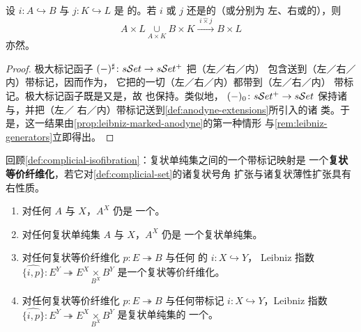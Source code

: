 \begin{corollary}\label{cor:leibniz-anodyne}
设 $i\colon A\hookrightarrow B$ 与 $j\colon K\hookrightarrow L$ 是%
\trSimplicialSet{}的\trMonomorphism。若 $i$ 或 $j$ 还是\trAnodyne{}的（或分别为
左\trAnodyne、右\trAnodyne{}或\trInnerAnodyne{}的），则\trLeibnizProduct
\[ A\times L\underset{A\times K}{\cup}B\times K
   \xrightarrow{\;i\mathbin{\widehat{\times}}j\;}B\times L \]
亦然。
\end{corollary}

\begin{proof}
极大标记函子 $(-)^{\sharp}\colon s\mathcal{S}et\to s\mathcal{S}et^{+}$ 把（左／右／内）
\trHorn{}包含送到（左／右／内）带标记\trAnodyneExtension，因而作为\trLeftAdjoint，
它把\trSimplicialSet{}的一切（左／右／内）\trAnodyneExtension{}都带到（左／右／内）
带标记\trAnodyneExtension。极大标记函子既是\trLeftAdjoint{}又是\trRightAdjoint，故
也保持\trLeibnizProduct。类似地，\trForgetfulFunctor{}
$(-)_{0}\colon s\mathcal{S}et^{+}\to s\mathcal{S}et$ 保持诸\trProduct{}与\trColimit，并把（左／
右／内）带标记\trAnodyneExtension{}送到\cref{def:anodyne-extensions}所引入的诸\trAnodyneExtension%
类。于是，这一结果由\cref{prop:leibniz-marked-anodyne}的第一种情形
与\cref{rem:leibniz-generators}立即得出。
\end{proof}

回顾\cref{def:complicial-isofibration}：复状单纯集之间的一个带标记映射是
一个\textbf{复状等价纤维化}，若它对\cref{def:complicial-set}的诸复状号角
扩张与诸复状薄性扩张具有右\trLifting{}性质。

\begin{corollary}\label{cor:leibniz-exponential}
\begin{enumerate}[label=(\roman*)]
\item 对任何\trQuasiCategory{} $A$ 与\trSimplicialSet{} $X$，$A^{X}$ 仍是
  一个\trQuasiCategory。
\item 对任何复状单纯集 $A$ 与\trMarkedSimplicialSet{} $X$，$A^{X}$ 仍是
  一个复状单纯集。
\item 对任何复状等价纤维化 $p\colon E\twoheadrightarrow B$ 与任何%
  \trMarkedSimplicialSet{}的\trMonomorphism{} $i\colon X\hookrightarrow Y$，
  Leibniz 指数 $\widehat{\{i,p\}}\colon E^{Y}\twoheadrightarrow E^{X}\underset{B^{X}}{\times}B^{Y}$ 是一个复状等价纤维化。
\item 对任何复状等价纤维化 $p\colon E\twoheadrightarrow B$ 与任何带标记%
  \trAnodyneExtension $i\colon X\hookrightarrow Y$，Leibniz 指数
  $\widehat{\{i,p\}}\colon E^{Y}\twoheadrightarrow E^{X}\underset{B^{X}}{\times}B^{Y}$ 是复状单纯集的
  一个\trTrivialFibration。
\end{enumerate}
\end{corollary}

